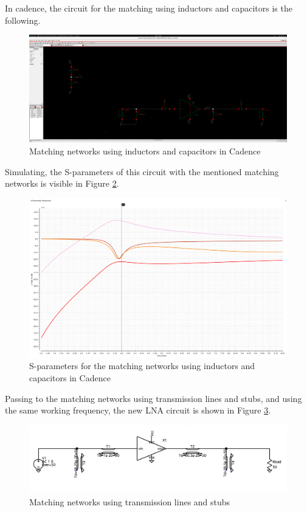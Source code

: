 In cadence, the circuit for the matching using inductors and capacitors is the following.

\begin{figure}[H]
    \centering
    \includegraphics*[scale = 0.1]{Images/CadenceLCcircuit.png}
    \caption{Matching networks using inductors and capacitors in Cadence}
    \label{fig:CadenceLCcircuit}
\end{figure}

Simulating, the S-parameters of this circuit with the mentioned matching networks is visible in Figure \ref{fig:CadenceLC}.

\begin{figure}[H]
    \centering
    \includegraphics[width=1\textwidth]{Images/LC_matching.png}
    \caption{S-parameters for the matching networks using inductors and capacitors in Cadence}
    \label{fig:CadenceLC}
\end{figure}

Passing to the matching networks using transmission lines and stubs, and using the same working frequency, the new LNA circuit is shown in Figure \ref{fig:SIMLSMatchingCircuit}.

\begin{figure}[H]
    \centering
    \includegraphics*[scale = 0.3]{Images/SIMLSmatchingcircuit.png}
    \caption{Matching networks using transmission lines and stubs}
    \label{fig:SIMLSMatchingCircuit}
\end{figure}

